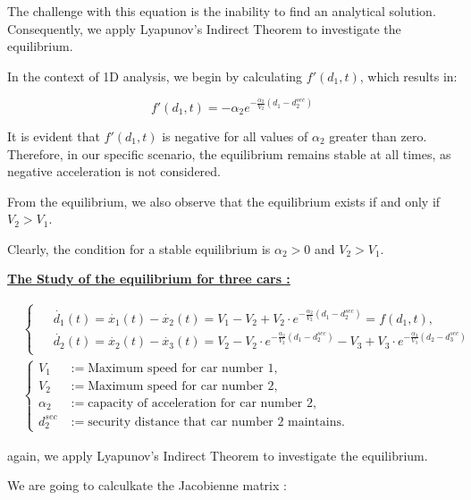 \documentclass{article}
\begin{document}
	The challenge with this equation is the inability to find an analytical solution. Consequently, we apply Lyapunov's Indirect Theorem to investigate the equilibrium.
	
	In the context of 1D analysis, we begin by calculating $f'(d_1, t)$, which results in:
	
	\[
	f'(d_1, t) = -\alpha_2e^{-\frac{\alpha_2}{V_2}(d_1 - d_{2}^{sec})}
	\]
	
	It is evident that $f'(d_1, t)$ is negative for all values of $\alpha_2$ greater than zero. Therefore, in our specific scenario, the equilibrium remains stable at all times, as negative acceleration is not considered.
	
	From the equilibrium, we also observe that the equilibrium exists if and only if $V_2 > V_1$.
	
	Clearly, the condition for a stable equilibrium is $\alpha_2 > 0$ and $V_2 > V_1$.
	
	
	\textbf{\underline{The Study of the equilibrium for three cars : }} \newline\newline
	
	\begin{align*}
		&\begin{cases}
			\begin{aligned}
				&\dot{d_1}(t) = \dot{x_1}(t) - \dot{x_2}(t) = V_1 - V_2 + V_2 \cdot e^{-\frac{\alpha_2}{V_2}(d_1 - d_{2}^{sec})} = f(d_1, t), \\
				&\dot{d_2}(t) = \dot{x_2}(t)-\dot{x_3}(t) = V_2 - V_2 \cdot e^{-\frac{\alpha_2}{V_2}(d_1 - d_{2}^{sec})} - V_3 + V_3 \cdot e^{-\frac{\alpha_3}{V_3}(d_2 - d_{3}^{sec})}
			\end{aligned}
		\end{cases}
		 \\
		&\left\{
		\begin{aligned}
			V_1 &:= \text{Maximum speed for car number 1}, \\
			V_2 &:= \text{Maximum speed for car number 2}, \\
			\alpha_2 &:= \text{capacity of acceleration for car number 2}, \\
			d_{2}^{sec} &:= \text{security distance that car number 2 maintains}.
		\end{aligned}
		\right.
	\end{align*}
	
	again, we apply Lyapunov's Indirect Theorem to investigate the equilibrium.
	
	
	We are going to calculkate the Jacobienne matrix : 
	
\end{document}
